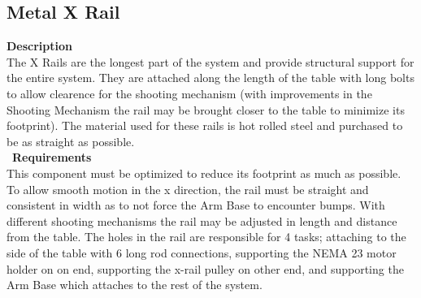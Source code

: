 \documentclass[titlepage]{article}
\begin{document}
\subsection{Metal X Rail}
\textbf{Description}\\
The X Rails are the longest part of the system and provide structural support for the entire system. They are attached along the length of the table with long bolts to allow clearence for the shooting mechanism (with improvements in the Shooting Mechanism the rail may be brought closer to the table to minimize its footprint). The material used for these rails is hot rolled steel and purchased to be as straight as possible.\\\
\textbf{Requirements}\\
This component must be optimized to reduce its footprint as much as possible. To allow smooth motion in the x direction, the rail must be straight and consistent in width as to not force the Arm Base to encounter bumps. With different shooting mechanisms the rail may be adjusted in length and distance from the table. The holes in the rail are responsible for 4 tasks; attaching to the side of the table with 6 long rod connections, supporting the NEMA 23 motor holder on on end, supporting the x-rail pulley on other end, and supporting the Arm Base which attaches to the rest of the system.
\end{document}
